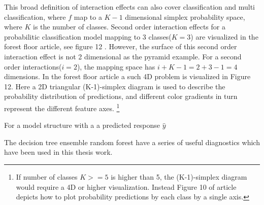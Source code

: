 This broad definition of interaction effects can also cover classification and multi classification, where $f$ map to a $K-1$ dimensional simplex probability space, where $K$ is the number of classes. Second order interaction effects for a probabilitic classification model mapping to 3 classes($K=3$) are visualized in the forest floor article, see figure 12 \cite{welling2016forest}. However, the surface of this second order interaction effect is not 2 dimensional as the pyramid example. For a second order interactions($i=2$), the mapping space has $i+K-1=2+3-1=4$ dimensions. In the forest floor article a such 4D problem is visualized in Figure 12. Here a 2D triangular (K-1)-simplex diagram is used to describe the probability distribution of predictions, and different color gradients in turn represent the different feature axes. 
\footnote{If number of classes $K>=5$ is higher than 5, the (K-1)-simplex diagram would require a 4D or higher visualization. Instead Figure 10 of article depicts how to plot probability predictions by each class by a single axis.}




For a model structure with a a predicted response $\hat{y}$ 

The decision tree ensemble random forest have a series of useful diagnostics which have been used in this thesis work.

\newpage


